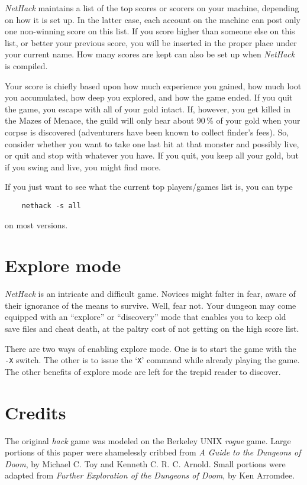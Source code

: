{\it NetHack\/} maintains a list of the top scores or scorers on your machine,
depending on how it is set up.  In the latter case, each account on
the machine can post only one non-winning score on this list.  If
you score higher than someone else on this list, or better your
previous score, you will be inserted in the proper place under your
current name.  How many scores are kept can also be set up when
{\it NetHack\/} is compiled.

Your score is chiefly based upon how much experience you gained, how
much loot you accumulated, how deep you explored, and how the game
ended.  If you quit the game, you escape with all of your gold intact.
If, however, you get killed in the Mazes of Menace, the guild will
only hear about 90\,\% of your gold when your corpse is discovered
(adventurers have been known to collect finder's fees).  So, consider
whether you want to take one last hit at that monster and possibly
live, or quit and stop with whatever you have.  If you quit, you keep
all your gold, but if you swing and live, you might find more.

If you just want to see what the current top players/games list is, you
can type
\begin{verbatim}
    nethack -s all
\end{verbatim}
on most versions.

\section{Explore mode}

{\it NetHack\/} is an intricate and difficult game.  Novices might falter
in fear, aware of their ignorance of the means to survive.  Well, fear
not.  Your dungeon may come equipped with an ``explore'' or ``discovery''
mode that enables you to keep old save files and cheat death, at the
paltry cost of not getting on the high score list.

There are two ways of enabling explore mode.  One is to start the game
with the {\tt -X}
switch.  The other is to issue the `{\tt X}' command while already playing
the game.  The other benefits of explore mode are left for the trepid
reader to discover.

\section{Credits}
The original %
{\it hack\/} game was modeled on the Berkeley
UNIX
{\it rogue\/} game.  Large portions of this paper were shamelessly
cribbed from %
{\it A Guide to the Dungeons of Doom}, by Michael C. Toy
and Kenneth C. R. C. Arnold.  Small portions were adapted from
{\it Further Exploration of the Dungeons of Doom}, by Ken Arromdee.

